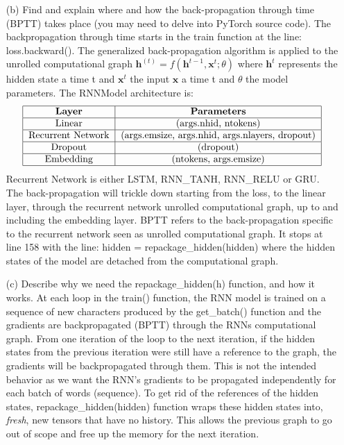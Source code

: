 \documentclass[11pt]{article}
\newcommand{\0}{\mat{0}}
\newcommand{\vect}[1]{\bm{#1}}     %
\begin{document}
\begin{itemize}
           
   \item[(b)]
   Find and explain where and how the back-propagation through time (BPTT) takes place (you may need to delve into PyTorch source code). 
   The backpropagation through time starts in the train function at the line: loss.backward(). The generalized back-propagation algorithm is applied to the unrolled computational graph $\vect{h}^(t) = f(\vect{h}^{t-1}, \vect{x}^t; \theta)$ where $\vect{h}^t$ represents the hidden state a time t and $\vect{x}^t$ the input $\vect{x}$ a time t and $\theta$ the model parameters.
   The RNNModel architecture is:
   \[
  	 \begin{tabular}{| c | c | c |}
  	  \hline
	  \textbf{Layer} & \textbf{Parameters}  \\
	  \hline
	  \text{Linear} & \text{(args.nhid, ntokens)}  \\
	  \hline
	  \text{Recurrent Network} & \text{(args.emsize, args.nhid, args.nlayers, dropout)}  \\
	  \hline
	  \text{Dropout} & \text{(dropout)} \\
	  \hline
	  \text{Embedding} & \text{(ntokens, args.emsize)}  \\
	  \hline
	\end{tabular}
\] 
Recurrent Network is either LSTM, RNN\_TANH, RNN\_RELU or GRU. The back-propagation will trickle down starting from the loss, to the linear layer, through the recurrent network unrolled computational graph, up to and including the embedding layer. BPTT refers to the back-propagation specific to the recurrent network seen as unrolled computational graph. It stops at line 158 with the line: hidden = repackage\_hidden(hidden) where the hidden states of the model are detached from the computational graph.
	
    \item[(c)]      
    Describe why we need the repackage\_hidden(h) function, and how it works.
 At each loop in the train() function, the RNN model is trained on a sequence of new characters produced by the  get\_batch() function and the gradients are backpropagated (BPTT) through the RNNs computational graph. From one iteration of the loop to the next iteration, if the hidden states from the previous iteration were still have a reference to the graph, the gradients will be backpropagated through them. This is not the intended behavior as we want the RNN's gradients to be propagated independently for each batch of words (sequence). To get rid of the references of the hidden states, repackage\_hidden(hidden) function  wraps these hidden states into, \textit{fresh}, new tensors that have no history. This allows the previous graph to go out of scope and free up the memory for the next iteration.
    

\end{itemize}
\end{document}
